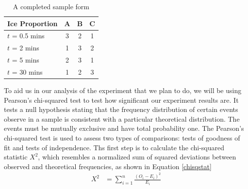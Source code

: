 \documentclass[oneside,12pt]{report}
\begin{document}
\begin{table}[ h]
\centering
\begin{tabular}{ l | c|c|c }
  Ice Proportion & A  & B & C  \\
\hline  
$t$ = 0.5 mins & 3&2 &1\\ 
\hline  
$t$ = 2 mins &1 &3 &2\\ 
\hline  
$t$ = 5 mins  &2 &3 &1\\ 
\hline  
$t$ = 30 mins &1 &2 &3\\ 
\hline  
   
 \end{tabular}
\caption{A completed sample form}

\end{table}

To aid us in our analysis of the experiment that we plan to do, we will be using Pearson's chi-squared test to test how significant our experiment results are. It tests a null hypothesis stating that the frequency distribution of certain events observe in a sample is consistent with a particular theoretical distribution. The events must be mutually exclusive and have total probability one.
\vspace{12pt}
\newline
The Pearson's chi-squared test is used to assess two types of comparisons: tests of goodness of fit and tests of independence. Ths first step is to calculate the chi-squared statistic $ X^2$, which resembles a normalized sum of squared deviations between observed and theoretical frequencies, as shown in Equation \eqref{chisqstat} 
\begin{align}
X^2 &= \sum_{i=1}^{n} {\frac{(O_{i}-E_{i})^2}{E_{i}}} \label{chisqstat}
\end{align}
\end{document}
